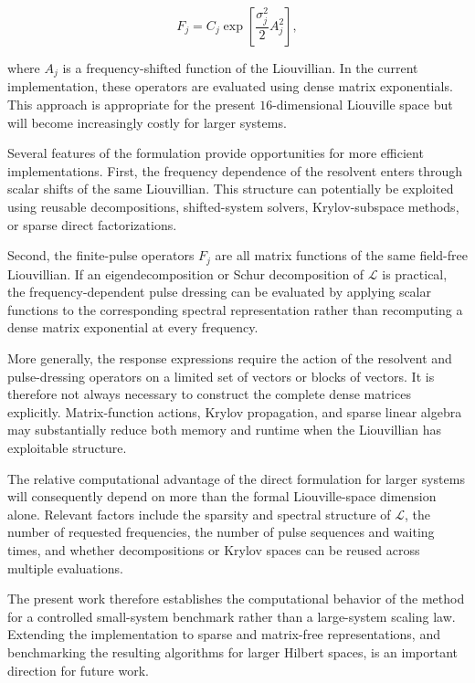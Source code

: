 \documentclass[11pt]{article}
\begin{document}
\begin{equation}
F_j
=
C_j
\exp
\left[
\frac{\sigma_j^2}{2}
A_j^2
\right],
\end{equation}

where $A_j$ is a frequency-shifted function of the Liouvillian.  In
the current implementation, these operators are evaluated using dense
matrix exponentials.  This approach is appropriate for the present
$16$-dimensional Liouville space but will become increasingly costly
for larger systems.

Several features of the formulation provide opportunities for more
efficient implementations.  First, the frequency dependence of the
resolvent enters through scalar shifts of the same Liouvillian.  This
structure can potentially be exploited using reusable decompositions,
shifted-system solvers, Krylov-subspace methods, or sparse direct
factorizations.

Second, the finite-pulse operators $F_j$ are all matrix functions of
the same field-free Liouvillian.  If an eigendecomposition or Schur
decomposition of $\mathcal{L}$ is practical, the frequency-dependent
pulse dressing can be evaluated by applying scalar functions to the
corresponding spectral representation rather than recomputing a dense
matrix exponential at every frequency.

More generally, the response expressions require the action of the
resolvent and pulse-dressing operators on a limited set of vectors or
blocks of vectors.  It is therefore not always necessary to construct
the complete dense matrices explicitly.  Matrix-function actions,
Krylov propagation, and sparse linear algebra may substantially reduce
both memory and runtime when the Liouvillian has exploitable structure.

The relative computational advantage of the direct formulation for
larger systems will consequently depend on more than the formal
Liouville-space dimension alone.  Relevant factors include the
sparsity and spectral structure of $\mathcal{L}$, the number of
requested frequencies, the number of pulse sequences and waiting
times, and whether decompositions or Krylov spaces can be reused across
multiple evaluations.

The present work therefore establishes the computational behavior of
the method for a controlled small-system benchmark rather than a
large-system scaling law.  Extending the implementation to sparse and
matrix-free representations, and benchmarking the resulting algorithms
for larger Hilbert spaces, is an important direction for future work.
\end{document}
